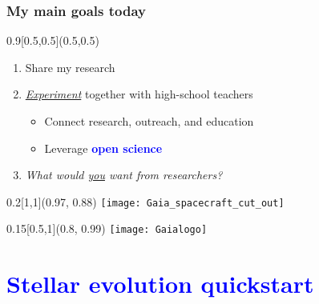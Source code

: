 \documentclass[xcolor=dvipsnames,professionalfonts, aspectratio=169]{beamer}
\begin{document}
\begin{frame}
  \frametitle{My main goals today}


  \begin{textblock}{0.9}[0.5,0.5](0.5,0.5)
    \centering
    \begin{enumerate}\Large
    \item Share my research\\[10pt]
    \item \emph{\underline{Experiment}} together with high-school teachers\\[10pt]
      \begin{itemize}\Large
      \item Connect research, outreach, and education
      \item Leverage \textcolor{Blue}{\textbf{open science}}
      \end{itemize}
    \item<2>[\textbf{Q.}] \emph{What would \underline{you} want from
        researchers?}
    \end{enumerate}
  \end{textblock}


  \begin{textblock}{0.2}[1,1](0.97, 0.88)
    \texttt{[image: Gaia\_spacecraft\_cut\_out]}
  \end{textblock}
  \begin{textblock}{0.15}[0.5,1](0.8, 0.99)
    \texttt{[image: Gaialogo]}
  \end{textblock}

\end{frame}


\section{\textcolor{Blue}{Stellar evolution quickstart}}
\end{document}
